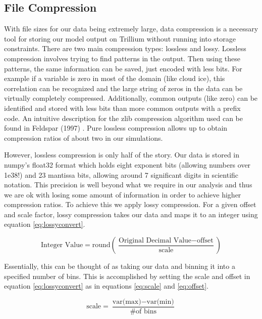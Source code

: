 \documentclass[12pt]{article}
\begin{document}
\subsection{File Compression}
With file sizes for our data being extremely large, data compression is a necessary tool for storing our model output on Trillium without running into storage constraints. There are two main compression types: lossless and lossy. Lossless compression involves trying to find patterns in the output. Then using these patterns, the same information can be saved, just encoded with less bits. For example if a variable is zero in most of the domain (like cloud ice), this correlation can be recognized and the large string of zeros in the data can be virtually completely compressed. Additionally, common outputs (like zero) can be identified and stored with less bits than more common outputs with a prefix code. An intuitive description for the zlib compression algorithm used can be found in Feldspar (1997) \cite{feldspar_explanation_1997}. Pure lossless compression allows up to obtain compression ratios of about two in our simulations.

However, lossless compression is only half of the story. Our data is stored in numpy's float32 format which holds eight exponent bits (allowing numbers over 1e38!) and 23 mantissa bits, allowing around 7 significant digits in scientific notation. This precision is well beyond what we require in our analysis and thus we are ok with losing some amount of information in order to achieve higher compression ratios. To achieve this we apply lossy compression. For a given offset and scale factor, lossy compression takes our data and maps it to an integer using equation \ref{eq:lossyconvert}.

\begin{equation}
\label{eq:lossyconvert}
\text{Integer Value} = \text{round}\left( \frac{\text{Original Decimal Value} - \text{offset}}{\text{scale}} \right)
\end{equation}

Essentially, this can be thought of as taking our data and binning it into a specified number of bins.  This is accomplished by setting the scale and offset in equation \ref{eq:lossyconvert} as in equations \ref{eq:scale} and \ref{eq:offset}.

\begin{equation}
\label{eq:scale}
\text{scale} = \frac{\text{var(max)} - \text{var(min)}}{\text{\# of bins}}
\end{equation}
\end{document}
